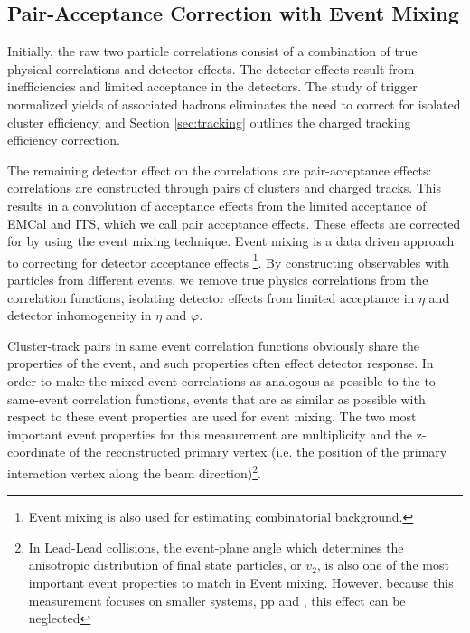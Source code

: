 \subsection{Pair-Acceptance Correction with Event Mixing}

\label{sec:EventMixing}
Initially, the raw two particle correlations consist of a combination of true physical correlations and detector effects. The detector effects result from inefficiencies and limited acceptance in the detectors. The study of trigger normalized yields of associated hadrons eliminates the need to correct for isolated cluster efficiency, and Section \ref{sec:tracking} outlines the charged tracking efficiency correction. %

The remaining detector effect on the correlations are pair-acceptance effects:
correlations are constructed through pairs of clusters and charged tracks. This results in a convolution of acceptance effects from the limited acceptance of EMCal and ITS, which we call pair acceptance effects. These effects are corrected for by using the event mixing technique. Event mixing is a data driven approach to correcting for detector acceptance effects \footnote{Event mixing is also used for estimating combinatorial background.}. By constructing observables with particles from different events, we remove true physics correlations from the correlation functions, isolating detector effects from limited acceptance in \(\eta\) and detector inhomogeneity in $\eta$ and $\varphi$. 


Cluster-track pairs in same event correlation functions obviously share the properties of the event, and such properties often effect detector response. In order to make the mixed-event correlations as analogous as possible to the to same-event correlation functions, events that are as similar as possible with respect to these event properties are used for event mixing. The two most important event properties for this measurement are multiplicity and the z-coordinate of the reconstructed primary vertex (i.e. the position of the primary interaction vertex along the beam direction)\footnote{In Lead-Lead collisions, the event-plane angle which determines the anisotropic distribution of final state particles, or $v_{2}$, is also one of the most important event properties to match in Event mixing. However, because this measurement focuses on smaller systems, pp and \pPb, this effect can be neglected}. %



